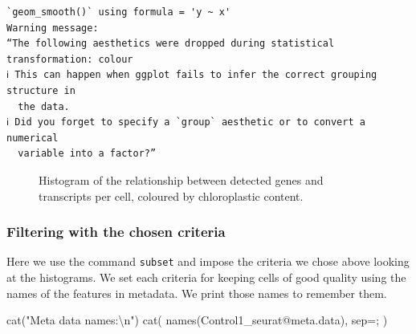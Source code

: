 \documentclass[
  letterpaper,
  DIV=11,
  numbers=noendperiod]{scrartcl}
\newenvironment{Shaded}{\begin{snugshade}}{\end{snugshade}}
\newcommand{\AttributeTok}[1]{\textcolor[rgb]{0.40,0.45,0.13}{#1}}
\newcommand{\FunctionTok}[1]{\textcolor[rgb]{0.28,0.35,0.67}{#1}}
\newcommand{\NormalTok}[1]{\textcolor[rgb]{0.00,0.23,0.31}{#1}}
\newcommand{\SpecialCharTok}[1]{\textcolor[rgb]{0.37,0.37,0.37}{#1}}
\newcommand{\StringTok}[1]{\textcolor[rgb]{0.13,0.47,0.30}{#1}}
\begin{document}
\begin{verbatim}
`geom_smooth()` using formula = 'y ~ x'
Warning message:
“The following aesthetics were dropped during statistical transformation: colour
ℹ This can happen when ggplot fails to infer the correct grouping structure in
  the data.
ℹ Did you forget to specify a `group` aesthetic or to convert a numerical
  variable into a factor?”
\end{verbatim}

\begin{figure}[H]


\caption{\label{fig-gentrach}Histogram of the relationship between
detected genes and transcripts per cell, coloured by chloroplastic
content.}

\end{figure}%

\subsubsection{Filtering with the chosen
criteria}\label{filtering-with-the-chosen-criteria}

Here we use the command \texttt{subset} and impose the criteria we chose
above looking at the histograms. We set each criteria for keeping cells
of good quality using the names of the features in metadata. We print
those names to remember them.

\begin{Shaded}
\begin{Highlighting}[]
\FunctionTok{cat}\NormalTok{(}\StringTok{"Meta data names:}\SpecialCharTok{\textbackslash{}n}\StringTok{"}\NormalTok{)}
\FunctionTok{cat}\NormalTok{( }\FunctionTok{names}\NormalTok{(Control1\_seurat}\SpecialCharTok{@}\NormalTok{meta.data), }\AttributeTok{sep=}\StringTok{\textquotesingle{}; \textquotesingle{}}\NormalTok{ )}
\end{Highlighting}
\end{Shaded}
\end{document}
